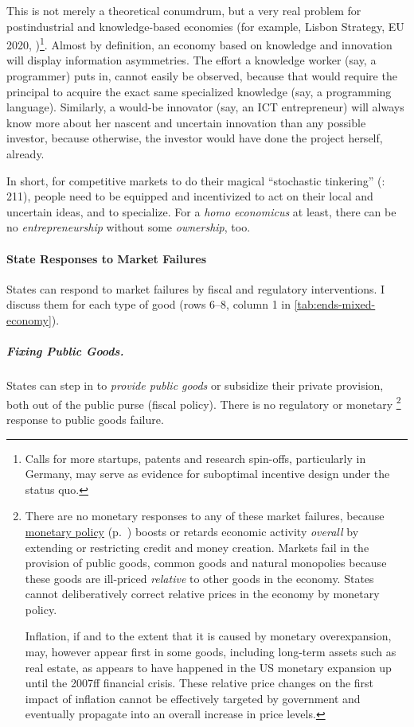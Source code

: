 This is not merely a theoretical conumdrum, but a very real problem for postindustrial  and knowledge-based economies (for example, Lisbon Strategy, EU 2020, \citealt{Bell-1973-aa})\footnote{
	Calls for more startups, patents and research spin-offs, particularly in Germany, may serve as evidence for suboptimal incentive design under the status quo.
}. 
Almost by definition, an economy based on knowledge and innovation will display information asymmetries. 
The effort a knowledge worker (say, a programmer) puts in, cannot easily be observed, because that would require the principal to acquire the exact same specialized knowledge (say, a programming language). 
Similarly, a would-be innovator (say, an \gls{ICT} entrepreneur) will always know more about her nascent and uncertain innovation than any possible investor, because otherwise, the investor would have done the project herself, already. 

In short, for competitive markets to do their magical ``stochastic tinkering'' (\citealt{Taleb2007}: 211), people need to be equipped and incentivized to act on their local and uncertain ideas, and to specialize. 
For a \emph{homo economicus} at least, there can be no \emph{entrepreneurship} without some \emph{ownership}, too.	


\paragraph{State Responses to Market Failures}  \label{sec:state-responses} 
States can respond to market failures by fiscal and regulatory interventions. 
I discuss them for each type of good (rows 6--8, column 1 in \autoref{tab:ends-mixed-economy}).

\subparagraph{Fixing Public Goods.}  \label{sec:public-good-response} 
States can step in to \emph{provide public goods} or subsidize their private provision, both out of the public purse (fiscal policy). 
There is no regulatory or monetary
\footnote{\label{fn:monetary-commons}
	There are no monetary responses to any of these market failures, because \hyperref[sec:monetary]{monetary policy} (p.~\pageref{sec:monetary}) boosts or retards economic activity \emph{overall} by extending or restricting credit and money creation. 
	Markets fail in the provision of public goods, common goods and natural monopolies because these goods are ill-priced \emph{relative} to other goods in the economy. 
	States cannot deliberatively correct relative prices in the economy by monetary policy.
	
	Inflation, if and to the extent that it is caused by monetary overexpansion, may, however appear first in some goods, including long-term assets such as real estate, as appears to have happened in the US monetary expansion up until the 2007ff financial crisis. %
	These relative price changes on the first impact of inflation cannot be effectively targeted by government and eventually propagate into an overall increase in price levels. %
}
response to public goods failure.

